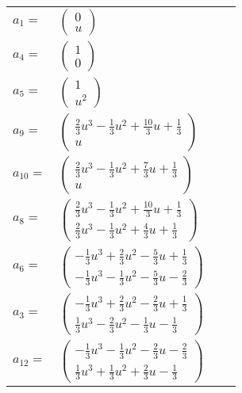 \documentclass[1p]{elsarticle_modified}
\theoremstyle{definition}
\begin{document}
\begin{tabular}{m{7pt} m{180pt} m{7pt} m{180pt} }
\flushright $a_{1}=$&$\begin{pmatrix}0\\u\end{pmatrix}$ \\
\flushright $a_{4}=$&$\begin{pmatrix}1\\0\end{pmatrix}$ \\
\flushright $a_{5}=$&$\begin{pmatrix}1\\u^2\end{pmatrix}$ \\
\flushright $a_{9}=$&$\begin{pmatrix}\frac{2}{3} u^3-\frac{1}{3} u^2+\frac{10}{3} u+\frac{1}{3}\\u\end{pmatrix}$ \\
\flushright $a_{10}=$&$\begin{pmatrix}\frac{2}{3} u^3-\frac{1}{3} u^2+\frac{7}{3} u+\frac{1}{3}\\u\end{pmatrix}$ \\
\flushright $a_{8}=$&$\begin{pmatrix}\frac{2}{3} u^3-\frac{1}{3} u^2+\frac{10}{3} u+\frac{1}{3}\\\frac{2}{3} u^3-\frac{1}{3} u^2+\frac{4}{3} u+\frac{1}{3}\end{pmatrix}$ \\
\flushright $a_{6}=$&$\begin{pmatrix}-\frac{1}{3} u^3+\frac{2}{3} u^2-\frac{5}{3} u+\frac{1}{3}\\-\frac{1}{3} u^3-\frac{1}{3} u^2-\frac{5}{3} u-\frac{2}{3}\end{pmatrix}$ \\
\flushright $a_{3}=$&$\begin{pmatrix}-\frac{1}{3} u^3+\frac{2}{3} u^2-\frac{2}{3} u+\frac{1}{3}\\\frac{1}{3} u^3-\frac{2}{3} u^2-\frac{1}{3} u-\frac{1}{3}\end{pmatrix}$ \\
\flushright $a_{12}=$&$\begin{pmatrix}-\frac{1}{3} u^3-\frac{1}{3} u^2-\frac{2}{3} u-\frac{2}{3}\\\frac{1}{3} u^3+\frac{1}{3} u^2+\frac{2}{3} u-\frac{1}{3}\end{pmatrix}$ \\

\end{tabular}
\end{document}
